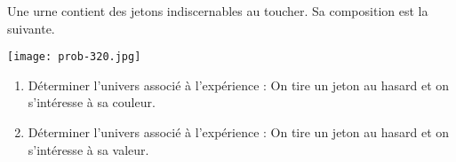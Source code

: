 
Une urne contient des jetons indiscernables au toucher. Sa composition est la suivante.
 
\texttt{[image: prob-320.jpg]}  

\begin{enumerate}
\item Déterminer l'univers associé à l'expérience : On tire un jeton au hasard et on s'intéresse à sa couleur.
\item Déterminer l'univers associé à l'expérience : On tire un jeton au hasard et on s'intéresse à sa valeur.
\end{enumerate}
